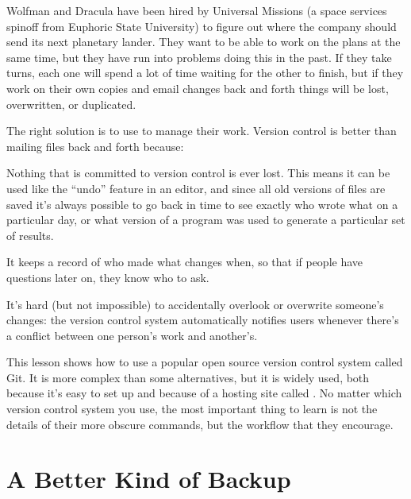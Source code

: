 \documentclass{book}
\begin{document}
Wolfman and Dracula have been hired by Universal Missions (a space
services spinoff from Euphoric State University) to figure out where the
company should send its next planetary lander. They want to be able to
work on the plans at the same time, but they have run into problems
doing this in the past. If they take turns, each one will spend a lot of
time waiting for the other to finish, but if they work on their own
copies and email changes back and forth things will be lost,
overwritten, or duplicated.

The right solution is to use  to manage their work. Version control is better than mailing
files back and forth because:

\begin{swcitemize}
\item
  Nothing that is committed to version control is ever lost. This means
  it can be used like the ``undo'' feature in an editor, and since all
  old versions of files are saved it's always possible to go back in
  time to see exactly who wrote what on a particular day, or what
  version of a program was used to generate a particular set of results.
\item
  It keeps a record of who made what changes when, so that if people
  have questions later on, they know who to ask.
\item
  It's hard (but not impossible) to accidentally overlook or overwrite
  someone's changes: the version control system automatically notifies
  users whenever there's a conflict between one person's work and
  another's.
\end{swcitemize}

This lesson shows how to use a popular open source version control
system called Git. It is more complex than some alternatives, but it is
widely used, both because it's easy to set up and because of a hosting
site called . No matter which version
control system you use, the most important thing to learn is not the
details of their more obscure commands, but the workflow that they
encourage.

\section{A Better Kind of Backup}
\end{document}
